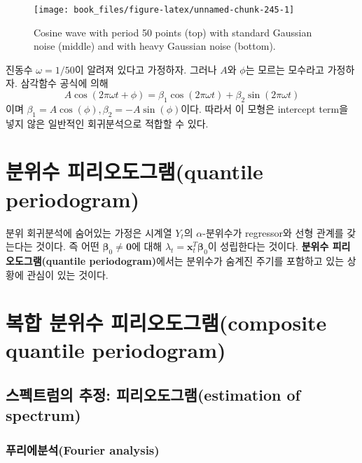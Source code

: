 \documentclass[b5paper,]{scrbook}
\theoremstyle{plain}
\theoremstyle{definition}
\numberwithin{equation}{section}
\begin{document}
\begin{figure}

{\centering \texttt{[image: book\_files/figure-latex/unnamed-chunk-245-1]} 

}

\caption{Cosine wave with period 50 points (top) with standard Gaussian noise (middle) and with heavy Gaussian noise (bottom).}\label{fig:unnamed-chunk-245}
\end{figure}

진동수 \(\omega=1/50\)이 알려져 있다고 가정하자. 그러나 \(A\)와 \(\phi\)는 모르는 모수라고 가정하자. 삼각함수 공식에 의해
\[A\cos (2\pi \omega t + \phi)=\beta_{1}\cos (2\pi \omega t) + \beta_{2}\sin (2\pi\omega t)\]
이며 \(\beta_{1}=A\cos(\phi), \beta_{2}=-A\sin(\phi)\)이다. 따라서 이 모형은 intercept term을 넣지 않은 일반적인 회귀분석으로 적합할 수 있다.

\hypertarget{-quantile-periodogram}{%
\section{분위수 피리오도그램(quantile periodogram)}\label{-quantile-periodogram}}

분위 회귀분석에 숨어있는 가정은 시계열 \(Y_{t}\)의 \(\alpha\)-분위수가 regressor와 선형 관계를 갖는다는 것이다. 즉 어떤 \(\boldsymbol{\beta}_{0}\neq\mathbf{0}\)에 대해 \(\lambda_{t}=\mathbf{x}_{t}^{T}\boldsymbol{\beta}_{0}\)이 성립한다는 것이다. \textbf{분위수 피리오도그램(quantile periodogram)}에서는 분위수가 숨계진 주기를 포함하고 있는 상황에 관심이 있는 것이다.

\hypertarget{--composite-quantile-periodogram}{%
\section{복합 분위수 피리오도그램(composite quantile periodogram)}\label{--composite-quantile-periodogram}}

\hypertarget{--estimation-of-spectrum}{%
\subsection{스펙트럼의 추정: 피리오도그램(estimation of spectrum)}\label{--estimation-of-spectrum}}

\hypertarget{fourier-analysis}{%
\subsubsection{푸리에분석(Fourier analysis)}\label{fourier-analysis}}
\end{document}
